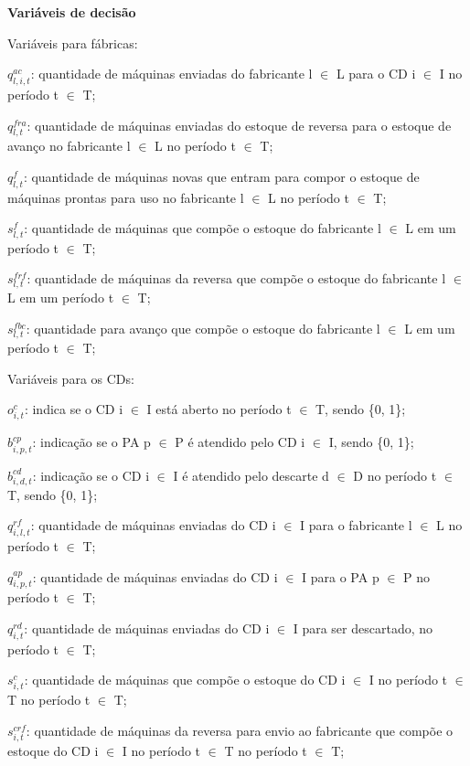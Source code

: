 \noindent \textbf{Variáveis de decisão}


Variáveis para fábricas:

$q^{ac}_{l,i,t}$: quantidade de máquinas enviadas do fabricante l $\in$ L para o CD i $\in$ I no período t $\in$ T;

$q^{fra}_{l,t}$: quantidade de máquinas enviadas do estoque de reversa para o estoque de avanço no fabricante l $\in$ L no período t $\in$ T;

$q^{f}_{l,t}$: quantidade de máquinas novas que entram para compor o estoque de máquinas prontas para uso no fabricante l $\in$ L no período t $\in$ T;

$s^{f}_{l,t}$: quantidade de máquinas que compõe o estoque do fabricante l $\in$ L em um período t $\in$ T;

$s^{frf}_{l,t}$: quantidade de máquinas da reversa que compõe o estoque do fabricante l $\in$ L em um período t $\in$ T;

$s^{fbc}_{l,t}$: quantidade para avanço que compõe o estoque do fabricante l $\in$ L em um período t $\in$ T;

Variáveis para os CDs:

$o^{c}_{i,t}$: indica se o CD i $\in$ I está aberto no período t $\in$ T, sendo \{0, 1\};

$b^{cp}_{i,p,t}$: indicação se o PA p $\in$ P é atendido pelo CD i $\in$ I, sendo \{0, 1\};

$b^{cd}_{i,d,t}$: indicação se o CD i $\in$ I é atendido pelo descarte d $\in$ D no período t $\in$ T, sendo \{0, 1\};

$q^{rf}_{i,l,t}$: quantidade de máquinas enviadas do CD i $\in$ I para o fabricante l $\in$ L no período t $\in$ T;

$q^{ap}_{i,p,t}$: quantidade de máquinas enviadas do CD i $\in$ I para o PA p $\in$ P no período t $\in$ T;

$q^{rd}_{i,t}$: quantidade de máquinas enviadas do CD i $\in$ I para ser descartado, no período t $\in$ T;

$s^{c}_{i,t}$: quantidade de máquinas que compõe o estoque do CD i $\in$ I no período t $\in$ T no período t $\in$ T;

$s^{crf}_{i,t}$: quantidade de máquinas da reversa para envio ao fabricante que compõe o estoque do CD i $\in$ I no período t $\in$ T no período t $\in$ T;

